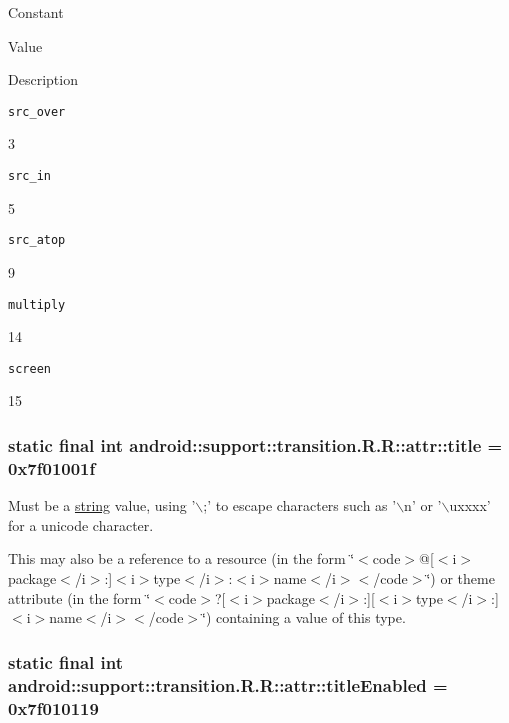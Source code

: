Constant

Value

Description 

{\tt src\_\-over}

3

{\tt src\_\-in}

5

{\tt src\_\-atop}

9

{\tt multiply}

14

{\tt screen}

15\hypertarget{classandroid_1_1support_1_1transition_1_1_r_1_1attr_6c282f9cd507976983192b52bc347fbb}{
\subsubsection[{title}]{\setlength{\rightskip}{0pt plus 5cm}static final int android::support::transition.R.R::attr::title = 0x7f01001f}}
\label{classandroid_1_1support_1_1transition_1_1_r_1_1attr_6c282f9cd507976983192b52bc347fbb}


Must be a \hyperlink{classandroid_1_1support_1_1transition_1_1_r_1_1string}{string} value, using '$\backslash$;' to escape characters such as '$\backslash$n' or '$\backslash$uxxxx' for a unicode character. 

This may also be a reference to a resource (in the form \char`\"{}$<$code$>$@\mbox{[}$<$i$>$package$<$/i$>$:\mbox{]}$<$i$>$type$<$/i$>$:$<$i$>$name$<$/i$>$$<$/code$>$\char`\"{}) or theme attribute (in the form \char`\"{}$<$code$>$?\mbox{[}$<$i$>$package$<$/i$>$:\mbox{]}\mbox{[}$<$i$>$type$<$/i$>$:\mbox{]}$<$i$>$name$<$/i$>$$<$/code$>$\char`\"{}) containing a value of this type. \hypertarget{classandroid_1_1support_1_1transition_1_1_r_1_1attr_78d6fcf0c1fef2a0da5156a75d53946f}{
\subsubsection[{titleEnabled}]{\setlength{\rightskip}{0pt plus 5cm}static final int android::support::transition.R.R::attr::titleEnabled = 0x7f010119}}
\label{classandroid_1_1support_1_1transition_1_1_r_1_1attr_78d6fcf0c1fef2a0da5156a75d53946f}


